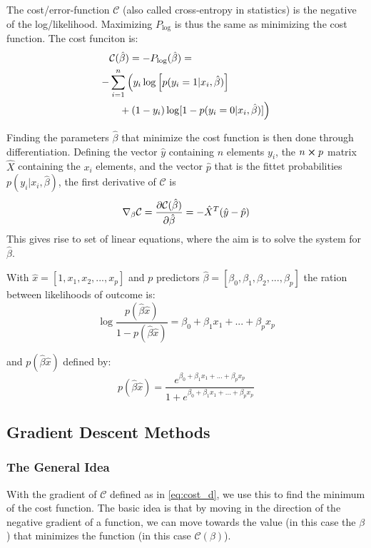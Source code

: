 The cost/error-function $\mathcal{C}$ (also called cross-entropy in statistics) is the negative of the log/likelihood. Maximizing $P_{\log}$ is thus the same as minimizing the cost function. The cost funciton is:
\begin{equation}
  \begin{split}
    &\mathcal{C}(\hat{\beta}) = - P_{\log}(\hat{\beta}) =  \\
    -&\sum_{i=1}^n \Big(y_i \log \qty[p(y_i = 1|x_i,\hat{\beta})] \\
    &\quad+ (1-y_i) \log [1 - p(y_i = 0|x_i,\hat{\beta})]\Big)
  \end{split}
  \label{eq:cost_function}
\end{equation}

Finding the parameters $\hat{\beta}$ that minimize the cost function is then done through differentiation.
Defining the vector $\hat{y}$ containing $n$ elements $y_i$, the $n \cross p$ matrix $\hat{X}$ containing the $x_i$ elements, and the vector $\hat{p}$ that is the fittet probabilities $p(y_i|x_i,\hat{\beta})$, the first derivative of $\mathcal{C}$ is
\begin{equation}
  \nabla_\beta \mathcal{C} = \pdv{\mathcal{C}(\hat{\beta})}{\hat{\beta}} = - \hat{X}^T (\hat{y}-\hat{p})
  \label{eq:cost_d}
\end{equation}
This gives rise to set of linear equations, where the aim is to solve the system for $\hat{\beta}$.

With $\hat{x} = [1, x_1,x_2,...,x_p]$ and $p$ predictors $\hat{\beta} = [\beta_0,\beta_1,\beta_2,...,\beta_p]$ the ration between likelihoods of outcome is:
\begin{equation}
  \log \frac{p(\hat{\beta}\hat{x})}{1-p(\hat{\beta}\hat{x})} = \beta_0 + \beta_1x_1 + ... + \beta_px_p
  \label{eq:prob_ratio}
\end{equation}

\noindent and $p(\hat{\beta}\hat{x})$ defined by:
\begin{equation}
  p(\hat{\beta}\hat{x}) = \frac{e^{\beta_0 + \beta_1x_1 + ... + \beta_px_p}}{1+e^{\beta_0 + \beta_1x_1 + ... + \beta_px_p}}
  \label{eq:pBx}
\end{equation}

\subsection{Gradient Descent Methods}
\subsubsection*{The General Idea}
With the gradient of $\mathcal{C}$ defined as in \eqref{eq:cost_d}, we use this to find the minimum of the cost function. The basic idea is that by moving in the direction of the negative gradient of a function, we can move towards the value (in this case the $\beta$) that minimizes the function (in this case $\mathcal{C}(\beta)$). \cite{GDLectures}

